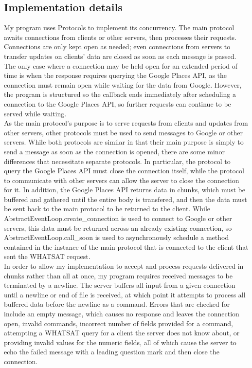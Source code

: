 \documentclass[letterpaper,twocolumn,10pt]{article}
\begin{document}
    \subsection{Implementation details}
    My program uses Protocols to implement its concurrency. The main protocol awaits connections from clients or other servers, then processes their requests. Connections are only kept open as needed; even connections from servers to transfer updates on clients' data are closed as soon as each message is passed. The only case where a connection may be held open for an extended period of time is when the response requires querying the Google Places API, as the connection must remain open while waiting for the data from Google. However, the program is structured so the callback ends immediately after scheduling a connection to the Google Places API, so further requests can continue to be served while waiting.\\
    As the main protocol's purpose is to serve requests from clients and updates from other servers, other protocols must be used to send messages to Google or other servers. While both protocols are similar in that their main purpose is simply to send a message as soon as the connection is opened, there are some minor differences that necessitate separate protocols. In particular, the protocol to query the Google Places API must close the connection itself, while the protocol to communicate with other servers can allow the server to close the connection for it. In addition, the Google Places API returns data in chunks, which must be buffered and gathered until the entire body is transfered, and then the data must be sent back to the main protocol to be returned to the client. While AbstractEventLoop.create\_connection is used to connect to Google or other servers, this data must be returned across an already existing connection, so AbstractEventLoop.call\_soon is used to asynchronously schedule a method contained in the instance of the main protocol that is connected to the client that sent the WHATSAT request.\\
    In order to allow my implementation to accept and process requests delivered in chunks rather than all at once, my program requires received messages to be terminated by a newline.
    The server buffers all input from a given connection until a newline or end of file is received, at which point it attempts to process all buffered data before the newline as a command. Errors that are checked for include an empty message, which causes no response and leaves the connection open, invalid commands, incorrect number of fields provided for a command, attempting a WHATSAT query for a client the server does not know about, or providing invalid values for the numeric fields, all of which cause the server to echo the failed message with a leading question mark and then close the connection.\\
\end{document}
